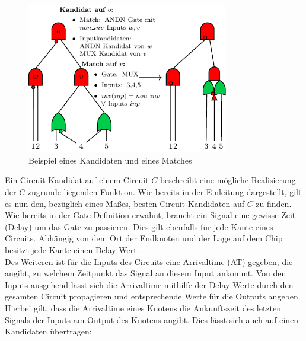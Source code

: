 \documentclass[11pt, a4paper, german]{article}
\begin{document}
\begin{figure}[h]
\begin{center}
 \includegraphics[width = 250pt]{./pictures/compiled/grundl_def_veransch.pdf}
 \caption{Beispiel eines  Kandidaten und eines Matches}
 \label{bild:grundl_definitionen}
\end{center}
\end{figure}

Ein Circuit-Kandidat auf einem Circuit $C$ beschreibt eine mögliche Realisierung der $C$ zugrunde liegenden Funktion.  Wie bereits in der Einleitung dargestellt, gilt es nun den, bezüglich eines Ma{\ss}es, besten Circuit-Kandidaten auf $C$ zu finden.\\

Wie bereits in der Gate-Definition erwähnt, braucht ein Signal eine gewisse Zeit (Delay) um das Gate zu passieren. Dies gilt ebenfalls für jede Kante eines Circuits. Abhängig von dem Ort der Endknoten und der Lage auf dem Chip besitzt jede Kante einen Delay-Wert. \\
Des Weiteren ist für die Inputs des Circuits eine Arrivaltime (AT) gegeben, die angibt, zu welchem Zeitpunkt das Signal an diesem Input ankommt. Von den Inputs ausgehend lässt sich die Arrivaltime mithilfe der Delay-Werte durch den gesamten Circuit propagieren und entsprechende Werte für die Outputs angeben. Hierbei gilt, dass die Arrivaltime eines Knotens die Ankunftszeit des letzten Signals der Inputs am Output des Knotens angibt. Dies lässt sich auch auf einen Kandidaten übertragen:
\end{document}
